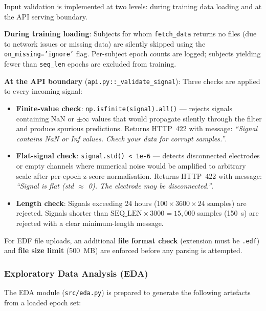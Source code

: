 \documentclass[10pt]{article}
\begin{document}
Input validation is implemented at two levels: during training data loading and at the API serving boundary.

\textbf{During training loading}: Subjects for whom \texttt{fetch\_data} returns no files (due to network issues or missing data) are silently skipped using the \texttt{on\_missing='ignore'} flag. Per-subject epoch counts are logged; subjects yielding fewer than \texttt{seq\_len} epochs are excluded from training.

\textbf{At the API boundary} (\texttt{api.py::\_validate\_signal}): Three checks are applied to every incoming signal:
\begin{itemize}
  \item \textbf{Finite-value check}: \texttt{np.isfinite(signal).all()} --- rejects signals containing NaN or $\pm\infty$ values that would propagate silently through the filter and produce spurious predictions. Returns HTTP~422 with message: \textit{``Signal contains NaN or Inf values. Check your data for corrupt samples.''}.
  \item \textbf{Flat-signal check}: \texttt{signal.std() < 1e-6} --- detects disconnected electrodes or empty channels where numerical noise would be amplified to arbitrary scale after per-epoch z-score normalisation. Returns HTTP~422 with message: \textit{``Signal is flat (std $\approx$ 0). The electrode may be disconnected.''}.
  \item \textbf{Length check}: Signals exceeding 24 hours ($100 \times 3600 \times 24$ samples) are rejected. Signals shorter than $\text{SEQ\_LEN} \times 3000 = 15{,}000$ samples (150~s) are rejected with a clear minimum-length message.
\end{itemize}

For EDF file uploads, an additional \textbf{file format check} (extension must be \texttt{.edf}) and \textbf{file size limit} (500~MB) are enforced before any parsing is attempted.

\subsubsection{Exploratory Data Analysis (EDA)}
\label{sec:eda}

The EDA module (\texttt{src/eda.py}) is prepared to generate the following artefacts from a loaded epoch set:
\end{document}
